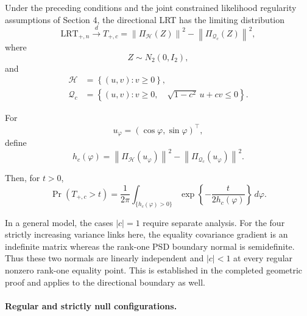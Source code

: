 \begin{proposition}
\label{prop:directional-rankone-limit}

Under the preceding conditions and the joint
constrained likelihood regularity assumptions of
Section 4, the directional LRT has the limiting
distribution
\begin{equation}
\mathrm{LRT}_{+,n}
\xrightarrow{d}
T_{+,c}
=
\left\|
\Pi_{\mathcal H}(Z)
\right\|^2
-
\left\|
\Pi_{\mathcal Q_c}(Z)
\right\|^2,
\label{eq:directional-rankone-limit}
\end{equation}
where
\begin{equation*}
Z\sim N_2(0,I_2),
\end{equation*}
and
\begin{align*}
\mathcal H
&=
\left\{
(u,v):
v\geq 0
\right\},
\\
\mathcal Q_c
&=
\left\{
(u,v):
v\geq 0,
\quad
\sqrt{1-c^2}\,u+cv\leq 0
\right\}.
\end{align*}

For
\begin{equation*}
u_\varphi
=
(\cos\varphi,\sin\varphi)^\top,
\end{equation*}
define
\begin{equation*}
h_c(\varphi)
=
\left\|
\Pi_{\mathcal H}(u_\varphi)
\right\|^2
-
\left\|
\Pi_{\mathcal Q_c}(u_\varphi)
\right\|^2.
\end{equation*}

Then, for $t>0$,
\begin{equation}
\Pr(T_{+,c}>t)
=
\frac{1}{2\pi}
\int_{\{h_c(\varphi)>0\}}
\exp
\left\{
-\frac{t}{2h_c(\varphi)}
\right\}
\,d\varphi.
\label{eq:directional-angular-tail}
\end{equation}

\end{proposition}

In a general model, the cases $|c|=1$ require separate analysis.
For the four strictly increasing variance links here, the equality
covariance gradient is an indefinite matrix whereas the rank-one
PSD boundary normal is semidefinite. Thus these two normals are
linearly independent and $|c|<1$ at every regular nonzero rank-one
equality point. This is established in the completed geometric proof
and applies to the directional boundary as well.

\paragraph{Regular and strictly null configurations.}


